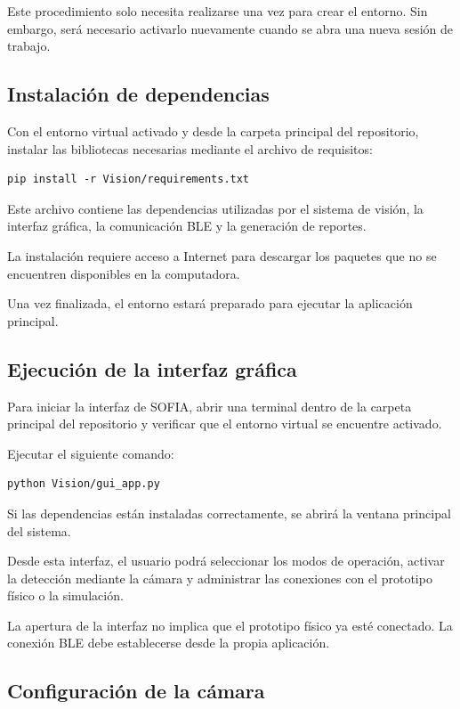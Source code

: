 \documentclass[letterpaper,journal]{IEEEtran}
\begin{document}
Este procedimiento solo necesita realizarse una
vez para crear el entorno. Sin embargo, será
necesario activarlo nuevamente cuando se abra
una nueva sesión de trabajo.

\subsection{Instalación de dependencias}

Con el entorno virtual activado y desde la carpeta
principal del repositorio, instalar las bibliotecas
necesarias mediante el archivo de requisitos:

\begin{verbatim}
pip install -r Vision/requirements.txt
\end{verbatim}

Este archivo contiene las dependencias utilizadas
por el sistema de visión, la interfaz gráfica,
la comunicación BLE y la generación de reportes.

La instalación requiere acceso a Internet para
descargar los paquetes que no se encuentren
disponibles en la computadora.

Una vez finalizada, el entorno estará preparado
para ejecutar la aplicación principal.

\subsection{Ejecución de la interfaz gráfica}

Para iniciar la interfaz de SOFIA, abrir una
terminal dentro de la carpeta principal del
repositorio y verificar que el entorno virtual
se encuentre activado.

Ejecutar el siguiente comando:

\begin{verbatim}
python Vision/gui_app.py
\end{verbatim}

Si las dependencias están instaladas correctamente,
se abrirá la ventana principal del sistema.

Desde esta interfaz, el usuario podrá seleccionar
los modos de operación, activar la detección
mediante la cámara y administrar las conexiones
con el prototipo físico o la simulación.

La apertura de la interfaz no implica que el
prototipo físico ya esté conectado. La conexión
BLE debe establecerse desde la propia aplicación.

\subsection{Configuración de la cámara}
\end{document}
